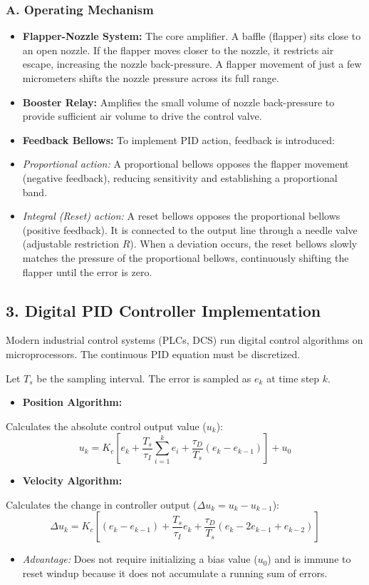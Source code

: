 \subsubsection{A. Operating Mechanism}
\begin{itemize}
  \item \textbf{Flapper-Nozzle System:} The core amplifier. A baffle (flapper) sits close to an open nozzle. If the flapper moves closer to the nozzle, it restricts air escape, increasing the nozzle back-pressure. A flapper movement of just a few micrometers shifts the nozzle pressure across its full range.
  \item \textbf{Booster Relay:} Amplifies the small volume of nozzle back-pressure to provide sufficient air volume to drive the control valve.
  \item \textbf{Feedback Bellows:} To implement PID action, feedback is introduced:
  \item \textit{Proportional action:} A proportional bellows opposes the flapper movement (negative feedback), reducing sensitivity and establishing a proportional band.
  \item \textit{Integral (Reset) action:} A reset bellows opposes the proportional bellows (positive feedback). It is connected to the output line through a needle valve (adjustable restriction $R$). When a deviation occurs, the reset bellows slowly matches the pressure of the proportional bellows, continuously shifting the flapper until the error is zero.
\end{itemize}


\subsection{3. Digital PID Controller Implementation}
Modern industrial control systems (PLCs, DCS) run digital control algorithms on microprocessors. The continuous PID equation must be discretized.

Let $T_s$ be the sampling interval. The error is sampled as $e_k$ at time step $k$.

\begin{itemize}
  \item \textbf{Position Algorithm:}
\end{itemize}
  Calculates the absolute control output value ($u_k$):
  \[ u_k = K_c \left[ e_k + \frac{T_s}{\tau_I} \sum_{i=1}^k e_i + \frac{\tau_D}{T_s} (e_k - e_{k-1}) \right] + u_0 \]
\begin{itemize}
  \item \textbf{Velocity Algorithm:}
\end{itemize}
  Calculates the change in controller output ($\Delta u_k = u_k - u_{k-1}$):
  \[ \Delta u_k = K_c \left[ (e_k - e_{k-1}) + \frac{T_s}{\tau_I} e_k + \frac{\tau_D}{T_s} (e_k - 2e_{k-1} + e_{k-2}) \right] \]
\begin{itemize}
  \item \textit{Advantage:} Does not require initializing a bias value ($u_0$) and is immune to reset windup because it does not accumulate a running sum of errors.
\end{itemize}


